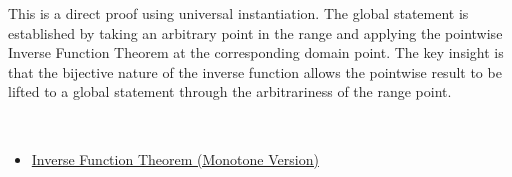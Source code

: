 \begin{remark*}
This is a direct proof using universal instantiation. The global statement is established by taking an arbitrary point in the range and applying the pointwise Inverse Function Theorem at the corresponding domain point. The key insight is that the bijective nature of the inverse function allows the pointwise result to be lifted to a global statement through the arbitrariness of the range point.
\end{remark*}

\begin{remark*}[Dependencies]~\\
\begin{itemize}
  \item \hyperref[thm:inverse-function-theorem-monotone]{Inverse Function Theorem (Monotone Version)}
\end{itemize}
\end{remark*}
